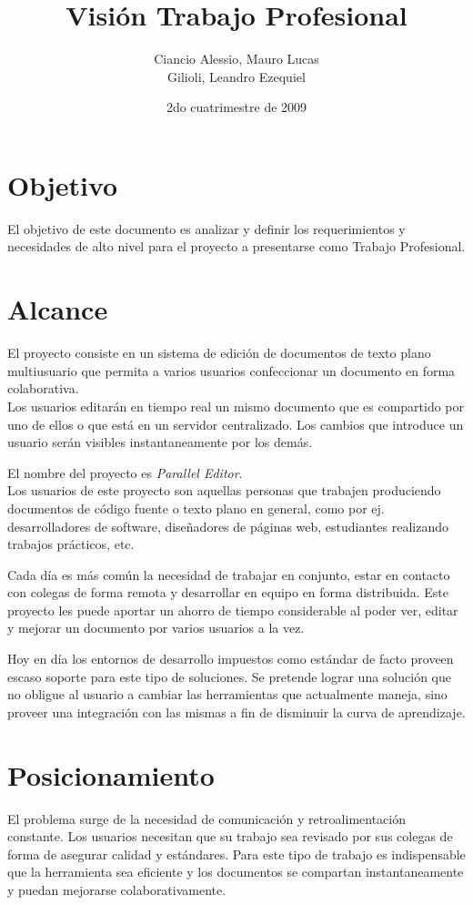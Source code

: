 \documentclass[a4paper,11pt]{article}
\title { Visi\'on Trabajo Profesional }
\date{2do cuatrimestre de 2009}
\author{Ciancio Alessio, Mauro Lucas \\ Gilioli, Leandro Ezequiel }
\begin{document}
	\maketitle

	\section{Objetivo}
		El objetivo de este documento es analizar y definir los requerimientos y
		necesidades de alto nivel para el proyecto a presentarse como Trabajo Profesional.

	\section{Alcance}
	    El proyecto consiste en un sistema de edici\'on de documentos de texto plano
	    multiusuario que permita a varios usuarios confeccionar un documento en forma
	    colaborativa. \\
	    Los usuarios editar\'an en tiempo real un mismo documento que es compartido por uno
	    de ellos o que est\'a en un servidor centralizado. Los cambios que introduce un usuario 
	    ser\'an visibles instantaneamente por los dem\'as.	
	    
		El nombre del proyecto es \textit{Parallel Editor}. \\

		Los usuarios de este proyecto son aquellas personas que trabajen produciendo 
		documentos de c\'odigo fuente o texto plano en general, como por ej. desarrolladores
		de software, dise\~nadores de p\'aginas web, estudiantes realizando trabajos pr\'acticos,
		etc.

		Cada d\'ia es m\'as com\'un la necesidad de trabajar en conjunto, estar en contacto
		con colegas de forma remota y desarrollar en equipo en forma distribuida. Este proyecto
		les puede aportar un ahorro de tiempo considerable al poder ver, editar y mejorar un
		documento por varios usuarios a la vez.

	    Hoy en d\'ia los entornos de desarrollo impuestos como est\'andar de facto proveen escaso
	    soporte para este tipo de soluciones. Se pretende lograr una soluci\'on que no obligue al
	    usuario a cambiar las herramientas que actualmente maneja, sino proveer una integraci\'on
	    con las mismas a fin de disminuir la curva de aprendizaje.

	\section{Posicionamiento}
		El problema surge de la necesidad de comunicaci\'on y retroalimentaci\'on constante.
		Los usuarios necesitan que su trabajo sea revisado por sus colegas de forma de asegurar
		calidad y est\'andares. Para este tipo de trabajo es indispensable que la herramienta sea
		eficiente y los documentos se compartan instantaneamente y puedan mejorarse colaborativamente.
\end{document}
